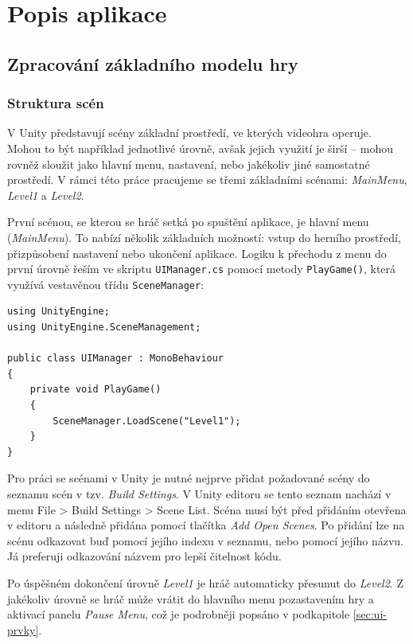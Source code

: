 \chapter{Popis aplikace}
\label{sec:popis-aplikace}

\section{Zpracování základního modelu hry}
\label{sec:zpracovani-zakladniho-modelu-hry}

\subsection{Struktura scén}
\label{sec:struktura-scen}

V Unity představují scény základní prostředí, ve kterých videohra operuje. Mohou to být například jednotlivé úrovně, avšak jejich využití je širší – mohou rovněž sloužit jako hlavní menu, nastavení, nebo jakékoliv jiné samostatné prostředí. V rámci této práce pracujeme se třemi základními scénami: \emph{MainMenu}, \emph{Level1} a \emph{Level2}.

První scénou, se kterou se hráč setká po spuštění aplikace, je hlavní menu (\emph{MainMenu}). To nabízí několik základních možností: vstup do herního prostředí, přizpůsobení nastavení nebo ukončení aplikace. Logiku k přechodu z menu do první úrovně řeším ve skriptu \texttt{UIManager.cs} pomocí metody \texttt{PlayGame()}, která využívá vestavěnou třídu \texttt{SceneManager}:

\begin{lstlisting}[caption={UIManager.PlayGame()}, label={lst:uimanager-playgame}]
using UnityEngine;
using UnityEngine.SceneManagement;

public class UIManager : MonoBehaviour
{
    private void PlayGame()
    {
        SceneManager.LoadScene("Level1");
    }
}
\end{lstlisting}

Pro práci se scénami v Unity je nutné nejprve přidat požadované scény do seznamu scén v tzv. \emph{Build Settings}. V Unity editoru se tento seznam nachází v menu File > Build Settings > Scene List. Scéna musí být před přidáním otevřena v editoru a následně přidána pomocí tlačítka \emph{Add Open Scenes}. Po přidání lze na scénu odkazovat buď pomocí jejího indexu v seznamu, nebo pomocí jejího názvu. Já preferuji odkazování názvem pro lepší čitelnost kódu.

Po úspěšném dokončení úrovně \emph{Level1} je hráč automaticky přesunut do \emph{Level2}. Z jakékoliv úrovně se hráč může vrátit do hlavního menu pozastavením hry a aktivací panelu \emph{Pause Menu}, což je podrobněji popsáno v podkapitole \ref{sec:ui-prvky}.


